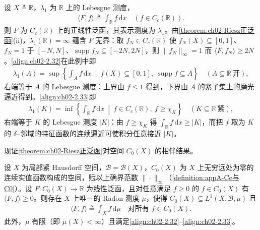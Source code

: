 \documentclass[../../main.tex]{subfiles}%
\begin{document}
\begin{example}\label{example:ch02-Riesz-Lebesgue}
设 $X\triangleq\mathbb R$，$\lambda_1$ 为 $\mathbb R$ 上的 Lebesgue 测度，
\begin{align*}
\langle F,f\rangle\triangleq\int_{\mathbb R}f\,\mathrm{d}x\quad(f\in C_c(\mathbb R)).
\end{align*}
则 $F$ 为 $C_c(\mathbb R)$ 上的正线性泛函，其表示测度为 $\lambda_1$。由\cref{theorem:ch02-Riesz正泛函}(ii)，$\lambda_1(\mathbb R)=\infty$ 蕴含 $F$ 无界：取 $f_N\in C_c(\mathbb R)$ 使 $f_N(X)\subseteq[0,1]$、$f_N=1$ 于 $[-N,N]$、$\operatorname{supp}f_N\subseteq[-2N,2N]$，则 $\|f_N\|_\infty=1$ 而 $\langle F,f_N\rangle\geqslant2N$。\eqref{align:ch02-2.32}在此例中即
\begin{align*}
\lambda_1(A)=\sup\left\{\int_Af\,\mathrm{d}x\ \middle|\ f(X)\subseteq[0,1],\ \operatorname{supp}f\subseteq A\right\}\quad(A\subseteq\mathbb R\ \text{开}),
\end{align*}
右端等于 $A$ 的 Lebesgue 测度：上界由 $f\leqslant1$ 得到，下界由 $A$ 的紧子集上的磨光逼近得到。\eqref{align:ch02-2.33}即
\begin{align*}
\lambda_1(K)=\inf\left\{\int_{\mathbb R}f\,\mathrm{d}x\ \middle|\ f\in C_c(\mathbb R),\ f\geqslant\chi_K\right\}\quad(K\subseteq\mathbb R\ \text{紧}),
\end{align*}
右端等于 $K$ 的 Lebesgue 测度 $|K|$：由 $f\geqslant\chi_K$ 得 $\int_{\mathbb R}f\,\mathrm{d}x\geqslant|K|$，而把 $f$ 取为 $K$ 的 $\delta$--邻域的特征函数的连续逼近可使积分任意接近 $|K|$。
\end{example}

现证\cref{theorem:ch02-Riesz正泛函}对空间 $C_0(X)$ 的相伴结果。

\begin{theorem}\label{theorem:ch02-RieszC0}\label{theorem:ch02-Riesz范数}\label{theorem:ch02-Riesz表示}
\label{theorem:ch02-Rf对偶}
设 $X$ 为局部紧 Hausdorff 空间，$\mathscr B=\mathscr B(X)$，$C_0(X)$ 为 $X$ 上无穷远处为零的连续实值函数构成的空间，赋以上确界范数 $\|\cdot\|_\infty$（\cref{definition:appA-Cc与C0}）。设 $F:C_0(X)\to\mathbb R$ 为线性泛函，且对任意满足 $f\geqslant0$ 的 $f\in C_0(X)$ 有 $\langle F,f\rangle\geqslant0$。则存在 $X$ 上唯一的 Radon 测度 $\mu$，使得 $C_0(X)\subseteq L^1(X,\mathscr B,\mu)$ 且
\begin{align}
\langle F,f\rangle\triangleq\int_Xf\,\mathrm{d}\mu\quad\text{对所有 }f\in C_0(X). \label{align:ch02-2.45}
\end{align}
此外，$\mu$ 有限（即 $\mu(X)<\infty$）且满足\eqref{align:ch02-2.32}--\eqref{align:ch02-2.33}。
\end{theorem}
\end{document}
